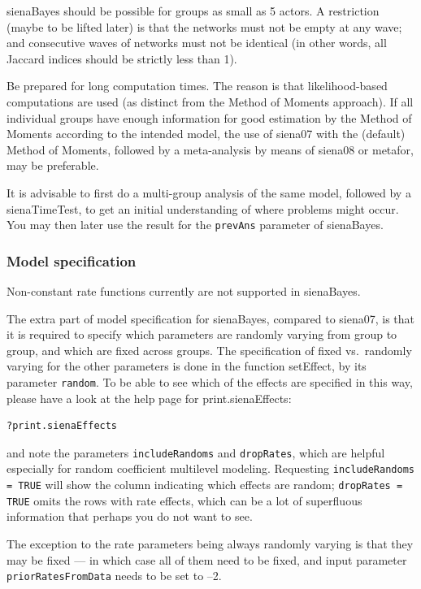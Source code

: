 \documentclass[a4paper,fleqn,11pt]{article}
\newcommand{\+}{\, + \,}
\newcommand{\sfn}[1]{\textsf{#1}}
\begin{document}
\textsf{sienaBayes} should be possible for groups as small as 5 actors.
A restriction (maybe to be lifted later) is that the networks must not be
empty at any wave; and consecutive waves of networks must not be identical
(in other words, all Jaccard indices should be strictly less than 1).

Be prepared for long computation times. The reason is that likelihood-based
computations are used (as distinct from the Method of Moments approach).
If all individual groups have enough information for good estimation by
the Method of Moments according to the intended model,
the use of \sfn{siena07} with the (default) Method of Moments, followed by a
meta-analysis by means of \sfn{siena08} or \sfn{metafor}, may be preferable.

It is advisable to first do a multi-group analysis of the same model,
followed by a \textsf{sienaTimeTest}, to get an initial understanding of where problems
might occur. You may then later use the result for the \texttt{prevAns}
parameter of \textsf{sienaBayes}.


\subsubsection{Model specification}

Non-constant rate functions currently are not supported in \textsf{sienaBayes}.

The extra part of model specification for \textsf{sienaBayes},
compared to \textsf{siena07},
is that it is required to specify which parameters are
randomly varying from group to group, and which are fixed across groups.
The specification of fixed vs.\ randomly varying
for the other parameters is done in the function
\textsf{setEffect}, by its parameter \texttt{random}.
To be able to see which of the effects are specified in this way,
please have a look at the help page for \sfn{print.sienaEffects}:
\begin{verbatim}
?print.sienaEffects
\end{verbatim}
and note the parameters \texttt{includeRandoms}
and \texttt{dropRates}, which are helpful especially for
random coefficient multilevel modeling.
Requesting \texttt{includeRandoms = TRUE} will show the column indicating
which effects are random; \texttt{dropRates = TRUE} omits the
rows with rate effects, which can be a lot of superfluous information
that perhaps you do not want to see.

The exception to the rate parameters being always randomly varying
is that they may be fixed --- in which case all of them need to be fixed,
and input parameter \\
\texttt{priorRatesFromData} needs to be set to --2.
\medskip
\end{document}
